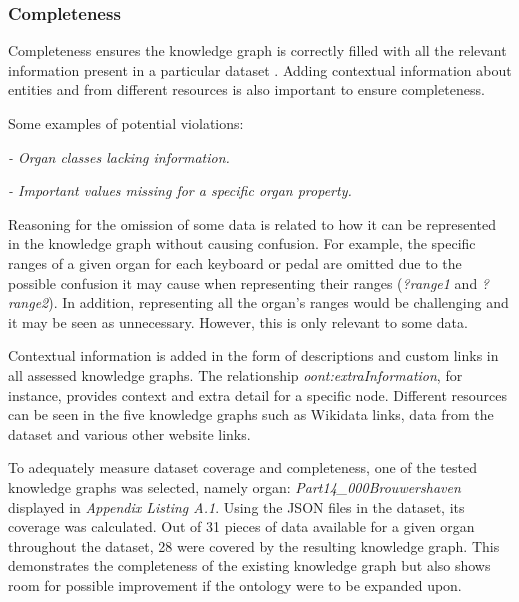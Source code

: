 \subsubsection{Completeness}
\hspace{0.5cm} Completeness ensures the knowledge graph is correctly filled with all the relevant information present in a particular dataset \cite{knowledgegraphevaulationbook}. Adding contextual information about entities and from different resources \cite{evaluationpaper} is also important to ensure completeness. 

\noindent Some examples of potential violations:

\vspace{-0.15cm}
\begin{displayquote}
    \textit{- Organ classes lacking information.}
\end{displayquote}
\vspace{-0.6cm}
\begin{displayquote}
    \textit{- Important values missing for a specific organ property.}
\end{displayquote}
\vspace{-0.1cm}

Reasoning for the omission of some data is related to how it can be represented in the knowledge graph without causing confusion. For example, the specific ranges of a given organ for each keyboard or pedal are omitted due to the possible confusion it may cause when representing their ranges (\textit{?range1} and \textit{?range2}). In addition, representing all the organ's ranges would be challenging and it may be seen as unnecessary. However, this is only relevant to some data. 

Contextual information is added in the form of descriptions and custom links in all assessed knowledge graphs. The relationship \textit{oont:extraInformation}, for instance, provides context and extra detail for a specific node. Different resources can be seen in the five knowledge graphs such as Wikidata links, data from the dataset and various other website links. 

To adequately measure dataset coverage and completeness, one of the tested knowledge graphs was selected, namely organ: \textit{Part14\_000Brouwershaven} displayed in \textit{Appendix Listing A.1}. Using the JSON files in the dataset, its coverage was calculated. Out of 31 pieces of data available for a given organ throughout the dataset, 28 were covered by the resulting knowledge graph. This demonstrates the completeness of the existing knowledge graph but also shows room for possible improvement if the ontology were to be expanded upon. 

